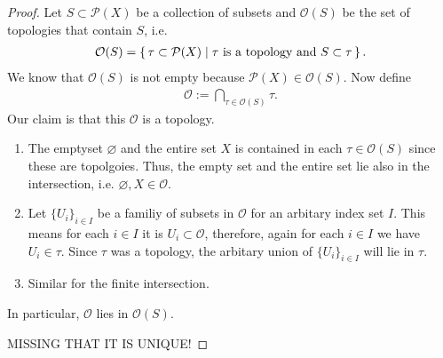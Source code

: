 \begin{proof}
    Let \(S \subset \mathcal{P}(X)\) be a collection of subsets and \(\mathcal{O}(S)\) be the set of topologies that contain \(S\), i.e.
    \begin{align*}
        \mathcal{O}(S) = \left\{\, \tau \subset \mathcal{P}(X) \mid \tau \text{ is a topology and } S \subset \tau \,\right\} \text{.}
    \end{align*}
    We know that \(\mathcal{O}(S)\) is not empty because \(\mathcal{P}(X) \in \mathcal{O}(S)\). Now define
    \begin{align*}
        \mathcal{O} := \bigcap_{\tau \in \mathcal{O}(S)} \tau \text{.}
    \end{align*}
    Our claim is that this \(\mathcal{O}\) is a topology.
    \begin{enumerate}
        \item The emptyset \(\varnothing\) and the entire set \(X\) is contained in each \(\tau \in \mathcal{O}(S)\) since these are topolgoies. Thus, the empty set and the entire set lie also in the intersection, i.e. \(\varnothing, X \in \mathcal{O}\).
        \item Let \(\{U_i\}_{i \in I}\) be a familiy of subsets in \(\mathcal{O}\) for an arbitary index set \(I\). This means for each \(i \in I\) it is \(U_i \subset \mathcal{O}\), therefore, again for each \(i \in I\) we have \(U_i \in \tau\). Since \(\tau\) was a topology, the arbitary union of \(\{U_i\}_{i \in I}\) will lie in \(\tau\).
        \item Similar for the finite intersection.
    \end{enumerate}
    In particular, \(\mathcal{O}\) lies in \(\mathcal{O}(S)\).

    MISSING THAT IT IS UNIQUE!
\end{proof}

